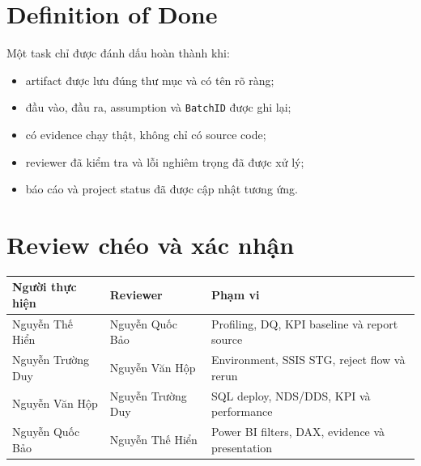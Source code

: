 \documentclass[11pt,a4paper]{article}
\begin{document}
\section{Definition of Done}
Một task chỉ được đánh dấu hoàn thành khi:
\begin{itemize}
  \item artifact được lưu đúng thư mục và có tên rõ ràng;
  \item đầu vào, đầu ra, assumption và \texttt{BatchID} được ghi lại;
  \item có evidence chạy thật, không chỉ có source code;
  \item reviewer đã kiểm tra và lỗi nghiêm trọng đã được xử lý;
  \item báo cáo và project status đã được cập nhật tương ứng.
\end{itemize}

\section{Review chéo và xác nhận}
\begin{table}[h]
\centering
\begin{tabularx}{\textwidth}{l l X}
\toprule
Người thực hiện & Reviewer & Phạm vi \\
\midrule
Nguyễn Thế Hiển & Nguyễn Quốc Bảo & Profiling, DQ, KPI baseline và report source \\
Nguyễn Trường Duy & Nguyễn Văn Hộp & Environment, SSIS STG, reject flow và rerun \\
Nguyễn Văn Hộp & Nguyễn Trường Duy & SQL deploy, NDS/DDS, KPI và performance \\
Nguyễn Quốc Bảo & Nguyễn Thế Hiển & Power BI filters, DAX, evidence và presentation \\
\bottomrule
\end{tabularx}
\end{table}
\end{document}
